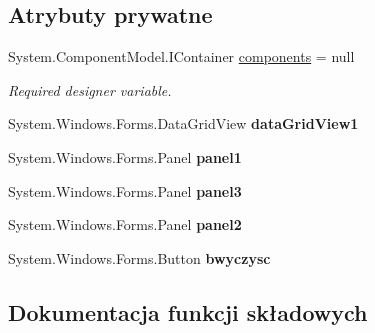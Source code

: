 \subsection*{Atrybuty prywatne}
\begin{DoxyCompactItemize}
\item 
System.\+Component\+Model.\+I\+Container \mbox{\hyperlink{class_proj__przegladarka_1_1_zapisane__strony_a7ff474026c9ee3e0291b8e826dd6f9e6}{components}} = null
\begin{DoxyCompactList}\small\item\em Required designer variable. \end{DoxyCompactList}\item 
\mbox{\label{class_proj__przegladarka_1_1_zapisane__strony_aa419c354c8c7a01b7f8f7fb391394ccb}} 
System.\+Windows.\+Forms.\+Data\+Grid\+View {\bfseries data\+Grid\+View1}
\item 
\mbox{\label{class_proj__przegladarka_1_1_zapisane__strony_ad6920e7b91eaeda164ca500675738602}} 
System.\+Windows.\+Forms.\+Panel {\bfseries panel1}
\item 
\mbox{\label{class_proj__przegladarka_1_1_zapisane__strony_ad38aaad72a1ea2ef9453faebbd96eac6}} 
System.\+Windows.\+Forms.\+Panel {\bfseries panel3}
\item 
\mbox{\label{class_proj__przegladarka_1_1_zapisane__strony_afce99efd2456b79bf800bb324fda0957}} 
System.\+Windows.\+Forms.\+Panel {\bfseries panel2}
\item 
\mbox{\label{class_proj__przegladarka_1_1_zapisane__strony_afbfee424b92ee4c7b869b48fac59f50b}} 
System.\+Windows.\+Forms.\+Button {\bfseries bwyczysc}
\end{DoxyCompactItemize}


\subsection{Dokumentacja funkcji składowych}
\mbox{\label{class_proj__przegladarka_1_1_zapisane__strony_a3d39dee3acf271f45e03b0ccd8630554}} 
